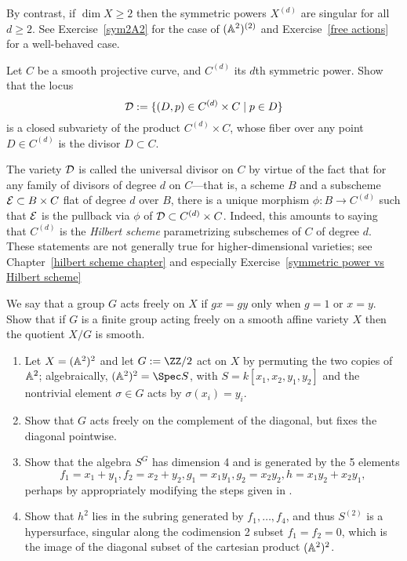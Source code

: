 By contrast, if $\dim X \geq 2$ then the symmetric powers $X^{(d)}$ are singular for all $d \geq 2$.
See Exercise~\ref{sym2A2} for the case of $(\AA^2)^{(2)}$ and Exercise~\ref{free actions} for a well-behaved case.

\begin{exercise}\label{universal divisor}
Let $C$ be a smooth projective curve, and $C^{(d)}$ its $d$th symmetric power. Show that the locus
$$
\cD := \{ (D, p) \in C^{(d)} \times C \mid p \in D \}
$$
is a closed subvariety of the product $C^{(d)} \times C$, whose fiber over any point $D \in C^{(d)}$ is the divisor $D \subset C$.
\end{exercise}

The variety $\cD$ is called the universal divisor on $C$ by virtue of the fact that for any family of divisors of degree $d$ on $C$---that is, a scheme $B$ and a subscheme $\cE \subset B \times C$ flat of degree $d$ over $B$, there is a unique morphism $\phi : B \to C^{(d)}$ such that $\cE$ is the pullback via $\phi$ of $\cD\subset C^{(d)} \times C$. Indeed, this amounts to saying that $C^{(d)}$ is the \emph{Hilbert scheme} parametrizing subschemes of $C$ of degree $d$. These statements are not generally true for higher-dimensional varieties; see Chapter~\ref{hilbert scheme chapter} and especially Exercise~\ref{symmetric power vs Hilbert scheme}

\begin{exercise}\label{free actions}
We say that a group $G$ acts freely on $X$ if $gx = gy$ only when $g =1$ or $x=y$. Show that
 if $G$ is a finite group acting freely on a smooth affine variety $X$ then the quotient $X/G$ is smooth.
\end{exercise}

\begin{exercise}
 \label{sym2A2} 
 \begin{enumerate}
 \item Let $X = (\AA^{2})^{2}$ and let $G := \ZZ/2$ act on $X$ by permuting the two copies of  $\AA^{2}$; algebraically,
$(\AA^{2})^{2} = \Spec S$, with $S = k[x_{1},x_{2}, y_{1}, y_{2}]$ and the nontrivial element $\sigma\in G$ acts by
$\sigma(x_{i}) = y_{i}$. 
\item Show that $G$ acts freely on the complement of the diagonal, but fixes the diagonal pointwise.
\item Show that the algebra $S^{G}$ has dimension 4 and is generated by the 5 elements
$$ 
f_{1} = x_{1}+y_{1}, f_{2} = x_{2}+y_{2}, g_{1} = x_{1}y_{1}, g_{2} = x_{2}y_{2}, h = x_{1}y_{2}+x_{2}y_{1},
$$
perhaps by appropriately modifying the steps given in \cite[Exercise 1.6]{E}. 
\item Show that $h^2$ lies in the subring generated by $f_1,\dots, f_4$, and thus $S^{(2)}$ is a hypersurface, singular
along the  codimension 2 subset $f_{1} = f_{2} = 0$, which is the image of the diagonal subset of the 
cartesian product $(\AA^{2})^{2}$.
\end{enumerate}
\end{exercise}




